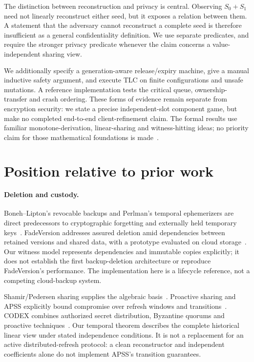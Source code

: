 \documentclass[pdflatex,sn-mathphys-num]{sn-jnl}
\theoremstyle{plain}
\theoremstyle{definition}
\begin{document}
The distinction between reconstruction and privacy is central. Observing $S_0+S_1$ need not linearly reconstruct either seed, but it exposes a relation between them. A statement that the adversary cannot reconstruct a complete seed is therefore insufficient as a general confidentiality definition. We use separate predicates, and require the stronger privacy predicate whenever the claim concerns a value-independent sharing view.

We additionally specify a generation-aware release/expiry machine, give a manual inductive safety argument, and execute TLC on finite configurations and unsafe mutations. A reference implementation tests the critical queue, ownership-transfer and crash ordering. These forms of evidence remain separate from encryption security: we state a precise independent-slot component game, but make no completed end-to-end client-refinement claim. The formal results use familiar monotone-derivation, linear-sharing and witness-hitting ideas; no priority claim for those mathematical foundations is made~\cite{karchmer1993}.

\section{Position relative to prior work}\label{sec:related}

\paragraph{Deletion and custody.}
Boneh--Lipton's revocable backups and Perlman's temporal ephemerizers are direct predecessors to cryptographic forgetting and externally held temporary keys~\cite{boneh1996,perlman2007}. FadeVersion addresses assured deletion amid dependencies between retained versions and shared data, with a prototype evaluated on cloud storage~\cite{rahumed2011}. Our witness model represents dependencies and immutable copies explicitly; it does not establish the first backup-deletion architecture or reproduce FadeVersion's performance. The implementation here is a lifecycle reference, not a competing cloud-backup system.

Shamir/Pedersen sharing supplies the algebraic basis~\cite{shamir1979,pedersen1991}. Proactive sharing and APSS explicitly bound compromise over refresh windows and transitions~\cite{herzberg1995,zhou2005}. CODEX combines authorized secret distribution, Byzantine quorums and proactive techniques~\cite{marsh2004}. Our temporal theorem describes the complete historical linear view under stated independence conditions. It is not a replacement for an active distributed-refresh protocol: a clean reconstructor and independent coefficients alone do not implement APSS's transition guarantees.
\end{document}
